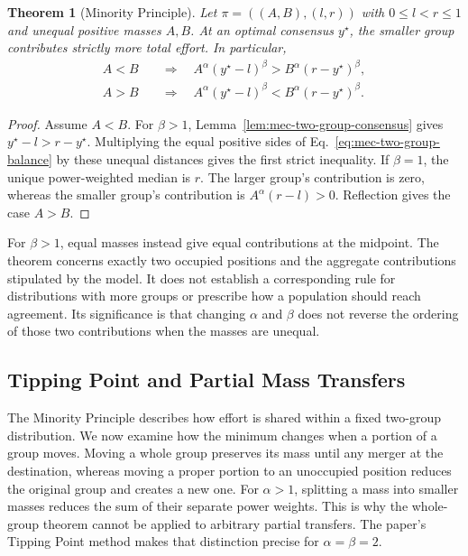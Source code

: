 \documentclass{article}
\theoremstyle{plain}
\newtheorem{theorem}{Theorem}
\theoremstyle{remark}
\begin{document}
\begin{theorem}[Minority Principle]\label{th:mec-minority}
Let $\pi=((A,B),(l,r))$ with $0\leq l<r\leq1$ and unequal positive masses $A,B$. At an optimal consensus $y^\star$, the smaller group contributes strictly more total effort. In particular,
\[
\begin{aligned}
A<B&\quad\Longrightarrow\quad
 A^\alpha(y^\star-l)^\beta>B^\alpha(r-y^\star)^\beta,\\
A>B&\quad\Longrightarrow\quad
 A^\alpha(y^\star-l)^\beta<B^\alpha(r-y^\star)^\beta.
\end{aligned}
\]
\end{theorem}
\begin{proof}
Assume $A<B$. For $\beta>1$, Lemma~\ref{lem:mec-two-group-consensus} gives $y^\star-l>r-y^\star$. Multiplying the equal positive sides of Eq.~\eqref{eq:mec-two-group-balance} by these unequal distances gives the first strict inequality. If $\beta=1$, the unique power-weighted median is $r$. The larger group's contribution is zero, whereas the smaller group's contribution is $A^\alpha(r-l)>0$. Reflection gives the case $A>B$.
\end{proof}

For $\beta>1$, equal masses instead give equal contributions at the midpoint. The theorem concerns exactly two occupied positions and the aggregate contributions stipulated by the model. It does not establish a corresponding rule for distributions with more groups or prescribe how a population should reach agreement. Its significance is that changing $\alpha$ and $\beta$ does not reverse the ordering of those two contributions when the masses are unequal.

\subsection{Tipping Point and Partial Mass Transfers}\label{subsec:mec-tipping}

The Minority Principle describes how effort is shared within a fixed two-group distribution. We now examine how the minimum changes when a portion of a group moves. Moving a whole group preserves its mass until any merger at the destination, whereas moving a proper portion to an unoccupied position reduces the original group and creates a new one. For $\alpha>1$, splitting a mass into smaller masses reduces the sum of their separate power weights. This is why the whole-group theorem cannot be applied to arbitrary partial transfers. The paper's Tipping Point method makes that distinction precise for $\alpha=\beta=2$.
\end{document}
